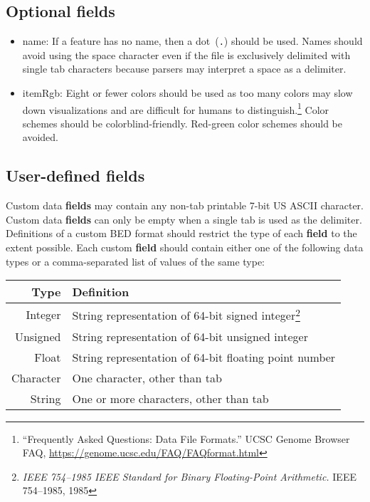 \documentclass[11pt]{article}
\begin{document}
\subsection{Optional fields}\label{sec:optional}
\begin{itemize}
\item \textsf{name}: If a feature has no name, then a dot~(\texttt{.}) should be used.
  Names should avoid using the space character even if the file is exclusively delimited with single tab characters because parsers may interpret a space as a delimiter.

\item \textsf{itemRgb}: Eight or fewer colors should be used as too many colors may slow down visualizations and are difficult for humans to distinguish.\footnote{``Frequently
    Asked Questions: Data File Formats.'' \ac{UCSC} Genome Browser FAQ,
    \url{https://genome.ucsc.edu/FAQ/FAQformat.html}}
  Color schemes should be colorblind-friendly.
  Red-green color schemes should be avoided.

\end{itemize}

\subsection{User-defined fields}

Custom data \textbf{fields} may contain any non-tab printable 7-bit US \ac{ASCII} character.
Custom data \textbf{fields} can only be empty when a single tab is used as the delimiter.
Definitions of a custom \ac{BED} format should restrict the type of each \textbf{field} to the extent possible.
Each custom \textbf{field} should contain either one of the following data types or a comma-separated list of values of the same type:

\noindent
\begin{tabularx}{\textwidth}{r L}
  \toprule
  Type & Definition \\
  \midrule
  Integer & String representation of 64-bit signed integer\footnote{\emph{IEEE 754--1985 IEEE Standard for Binary Floating-Point Arithmetic.} IEEE 754--1985, 1985} \\
  Unsigned & String representation of 64-bit unsigned integer\footnotemark[10] \\
  Float & String representation of 64-bit floating point number\footnotemark[10] \\
  Character & One character, other than tab \\
  String & One or more characters, other than tab \\
  \bottomrule
\end{tabularx}
\end{document}
